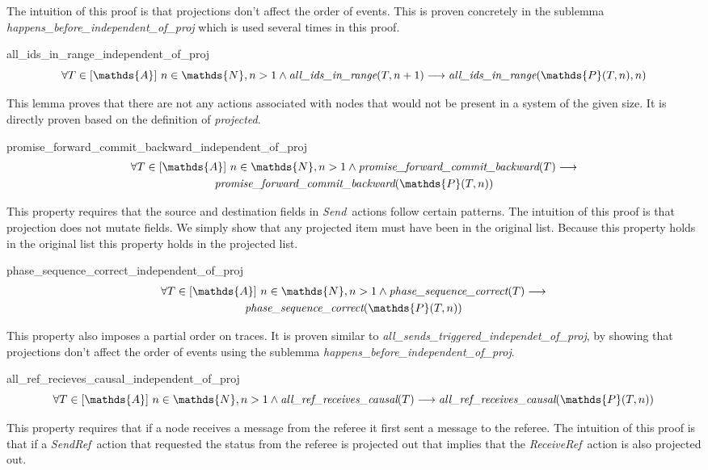 \documentclass[runningheads]{llncs}
\newcommand{\send}{\emph{Send}}
\newcommand{\sendref}{\emph{SendRef}}
\newcommand{\receiveref}{\emph{ReceiveRef}}
\newcommand{\action}{\mathds{A}}
\newcommand{\listaction}{[\action]}
\newcommand{\projectsize}[2]{\mathds{P}(#1, #2)}
\newcommand{\allir}[2]{\emph{all\_ids\_in\_range}(#1, #2)}
\newcommand{\pfcb}[1]{\emph{promise\_forward\_commit\_backward}(#1)}
\newcommand{\psc}[1]{\emph{phase\_sequence\_correct}(#1)}
\newcommand{\allrrc}[1]{\emph{all\_ref\_receives\_causal}(#1)}
\begin{document}
The intuition of this proof is that projections don't affect the order of events. This is proven concretely in the sublemma \emph{happens\_before\_independent\_of\_proj} which is used several times in this proof. 

\begin{lemma}{all\_ids\_in\_range\_independent\_of\_proj}
$$ \forall T \in \listaction\ n \in \mathds{N}, n > 1 \wedge \allir{T}{n+1} \longrightarrow \allir{\projectsize{T}{n}}{n} $$
\end{lemma}
This lemma proves that there are not any actions associated with nodes that would not be present in a system of the given size. It is directly proven based on the definition of \emph{projected}. 

\begin{lemma}{promise\_forward\_commit\_backward\_independent\_of\_proj}
\begin{multline*}
\forall T \in \listaction\ n \in \mathds{N}, n > 1 \wedge \pfcb{T} \longrightarrow \\
\pfcb{\projectsize{T}{n}} 
\end{multline*}
\end{lemma}
This property requires that the source and destination fields in \send\ actions follow certain patterns. The intuition of this proof is that projection does not mutate fields. We simply show that any projected item must have been in the original list. Because this property holds in the original list this property holds in the projected list.

\begin{lemma}{phase\_sequence\_correct\_independent\_of\_proj}
\begin{multline*}
\forall T \in \listaction\ n \in \mathds{N}, n > 1 \wedge \psc{T} \longrightarrow \\
\psc{\projectsize{T}{n}}
\end{multline*}
\end{lemma}
This property also imposes a partial order on traces. It is proven similar to \emph{all\_sends\_triggered\_independet\_of\_proj}, by showing that projections don't affect the order of events using the sublemma \emph{happens\_before\_independent\_of\_proj}. 

\begin{lemma}{all\_ref\_recieves\_causal\_independent\_of\_proj}
$$ \forall T \in \listaction\ n \in \mathds{N}, n > 1 \wedge \allrrc{T} \longrightarrow \allrrc{\projectsize{T}{n}} $$
\end{lemma}
This property requires that if a node receives a message from the referee it first sent a message to the referee. The intuition of this proof is that if a \sendref\ action that requested the status from the referee is projected out that implies that the \receiveref\ action is also projected out.
\end{document}
